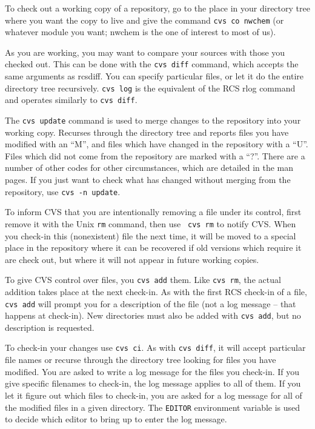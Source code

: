 To check out a working copy of a repository, go to the place in your
directory tree where you want the copy to live and give the command
{\tt cvs co nwchem} (or whatever module you want; nwchem is the one
of interest to most of us).

As you are working, you may want to compare your sources with those
you checked out.  This can be done with the {\tt cvs diff} command,
which accepts the same arguments as rcsdiff.  You can specify
particular files, or let it do the entire directory tree recursively.
{\tt cvs log} is the equivalent of the RCS rlog command and operates
similarly to {\tt cvs diff}.

The {\tt cvs update} command is used to merge changes to the
repository into your working copy.  Recurses through the directory
tree and reports files you have modified with an ``M'', and files
which have changed in the repository with a ``U''.  Files which did
not come from the repository are marked with a ``?''.  There are a
number of other codes for other circumstances, which are detailed in
the man pages. If you just want to check what has changed without
merging from the repository, use {\tt cvs -n update}.

To inform CVS that you are intentionally removing a file under its
control, first remove it with the Unix {\tt rm} command, then use {\tt
cvs rm} to notify CVS\@.  When you check-in this (nonexistent) file the
next time, it will be moved to a special place in the repository where
it can be recovered if old versions which require it are check out,
but where it will not appear in future working copies.

To give CVS control over files, you {\tt cvs add} them.  Like {\tt cvs
rm}, the actual addition takes place at the next check-in.  As with
the first RCS check-in of a file, {\tt cvs add} will prompt you for a
description of the file (not a log message -- that happens at
check-in).  New directories must also be added with {\tt cvs add}, but no
description is requested.

To check-in your changes use {\tt cvs ci}.  As with {\tt cvs diff},
it will accept particular file names or recurse through the directory
tree looking for files you have modified.  You are asked to write a
log message for the files you check-in.  If you give specific filenames
to check-in, the log message applies to all of them.  If you let it
figure out which files to check-in, you are asked for a log message for
all of the modified files in a given directory.  The {\tt EDITOR}
environment variable is used to decide which editor to bring up to
enter the log message.


